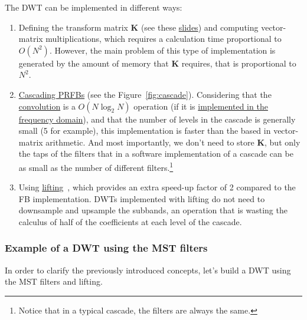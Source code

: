 The DWT can be implemented in different ways:
\begin{enumerate}
\item Defining the transform matrix ${\mathbf K}$ (see these
  \href{https://cseweb.ucsd.edu/classes/fa17/cse166-a/lec13.pdf}{slides})
  and computing vector-matrix multiplications, which requires a
  calculation time proportional to $O(N^2)$. However, the main problem
  of this type of implementation is generated by the amount of memory
  that ${\mathbf K}$ requires, that is proportional to $N^2$.
\item
  \href{https://en.wikipedia.org/wiki/Discrete_wavelet_transform#Cascading_and_filter_banks}{Cascading
    PRFBs} (see the Figure~\ref{fig:cascade}). Considering that the
  \href{https://en.wikipedia.org/wiki/Convolution}{convolution} is a
  $O(N\log_2N)$ operation (if it is
  \href{https://en.wikipedia.org/wiki/Convolution_theorem}{implemented
    in the frequency domain}), and that the number of levels in the
  cascade is generally small (5 for example), this implementation is
  faster than the based in vector-matrix arithmetic. And most
  importantly, we don't need to store ${\mathbf K}$, but only the taps
  of the filters that in a software implementation of a cascade can be
  as small as the number of different filters.\footnote{Notice that in
    a typical cascade, the filters are always the same.}
\item Using
  \href{https://en.wikipedia.org/wiki/Lifting_scheme}{lifting}~\cite{sweldens1997building},
  which provides an extra speed-up factor of 2 compared to the FB
  implementation. DWTs implemented with lifting do not need to
  downsample and upsample the subbands, an operation that is wasting
  the calculus of half of the coefficients at each level of the
  cascade.
\end{enumerate}


\subsubsection{Example of a DWT using the MST filters}

In order to clarify the previously introduced concepts, let's build a
DWT using the MST filters and lifting.

